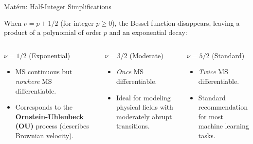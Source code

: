 \documentclass[aspectratio=169, 10pt]{beamer}
\begin{document}
\begin{frame}{Matérn: Half-Integer Simplifications}
  
  When $\nu = p + 1/2$ (for integer $p \ge 0$), the Bessel function disappears, leaving a product of a polynomial of order $p$ and an exponential decay:
  
  \vspace{6pt}
  \begin{columns}[t]
      \begin{block}{$\nu=1/2$ (Exponential)}
        \scriptsize
        \centering
        \vspace{4pt}
        \begin{itemize}
          \item MS continuous but \emph{nowhere} MS differentiable.
          \item Corresponds to the \textbf{Ornstein-Uhlenbeck (OU)} process (describes Brownian velocity).
        \end{itemize}
      \end{block}
      
      \begin{block}{$\nu=3/2$ (Moderate)}
        \scriptsize
        \centering
        \vspace{4pt}
        \begin{itemize}
          \item \emph{Once} MS differentiable.
          \item Ideal for modeling physical fields with moderately abrupt transitions.
        \end{itemize}
      \end{block}
      
      \begin{block}{$\nu=5/2$ (Standard)}
        \scriptsize
        \centering
        \vspace{4pt}
        \begin{itemize}
          \item \emph{Twice} MS differentiable.
          \item Standard recommendation for most machine learning tasks.
        \end{itemize}
      \end{block}
  \end{columns}
\end{frame}
\end{document}
